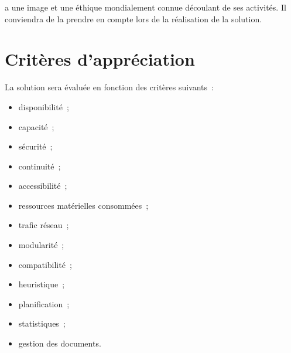 \begin{constraint}
\mo a une image et une éthique mondialement connue découlant de ses activités. Il conviendra de la prendre en compte lors de la réalisation de la solution.
\end{constraint}

\section{Critères d'appréciation}
La solution sera évaluée en fonction des critères suivants~:
\begin{itemize}
	\item disponibilité~;
	\item capacité~;
	\item sécurité~;
	\item continuité~;
	\item accessibilité~;
	\item ressources matérielles consommées~;
	\item trafic réseau~;
	\item modularité~;
	\item compatibilité~;
	\item heuristique~;
	\item planification~;
	\item statistiques~;
	\item gestion des documents.
\end{itemize}

